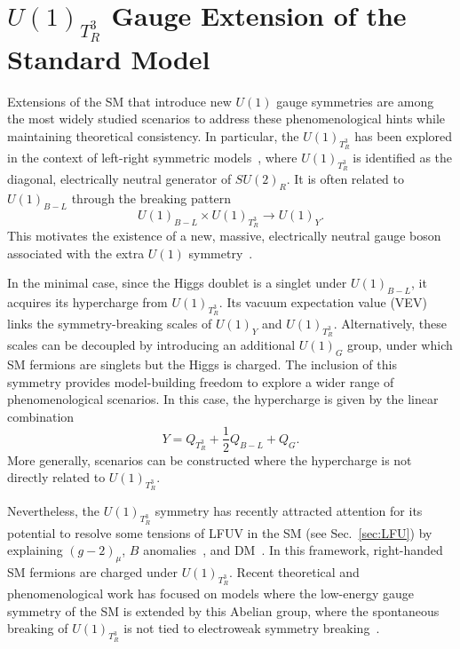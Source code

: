 \chapter{$U(1)_{T^3_R}$ Gauge Extension of the Standard Model}\label{ch:U1T3R}

Extensions of the SM that introduce new $U(1)$ gauge symmetries are among the most widely studied scenarios to address these phenomenological hints while maintaining theoretical consistency. In particular, the $U(1)_{T^3_R}$ has been explored in the context of left-right symmetric models~\parencite{Assad:2017iib, MohapatraPati1975, SenjanovicMohapatra1975}, where $U(1)_{T^3_R}$ is identified as the diagonal, electrically neutral generator of $SU(2)_R$. It is often related to $U(1)_{B-L}$ through the breaking pattern
\[
U(1)_{B-L} \times U(1)_{T^3_R} \rightarrow U(1)_Y.
\]
This motivates the existence of a new, massive, electrically neutral gauge boson associated with the extra $U(1)$ symmetry~\parencite{DiLuzio2018, Baker2019, Michaels:2020fzj, Dev:2021otb}. 

In the minimal case, since the Higgs doublet is a singlet under $U(1)_{B-L}$, it acquires its hypercharge from $U(1)_{T^3_R}$. Its vacuum expectation value (VEV) links the symmetry-breaking scales of $U(1)_Y$ and $U(1)_{T^3_R}$. Alternatively, these scales can be decoupled by introducing an additional $U(1)_G$ group, under which SM fermions are singlets but the Higgs is charged. The inclusion of this symmetry provides model-building freedom to explore a wider range of phenomenological scenarios. In this case, the hypercharge is given by the linear combination
\begin{equation}
Y=Q_{T^3_R}+\frac{1}{2}Q_{B-L} + Q_G.
\end{equation}
More generally, scenarios can be constructed where the hypercharge is not directly related to $U(1)_{T^3_R}$.

Nevertheless, the $U(1)_{T^3_R}$ symmetry has recently attracted attention for its potential to resolve some tensions of LFUV in the SM (see Sec.~\ref{sec:LFU}) by explaining $(g-2)_\mu$, $B$ anomalies~\parencite{Dutta2022}, and DM~\cite{Dutta2019, Dutta2020b, Dutta:2022qvn}. In this framework, right-handed SM fermions are charged under $U(1)_{T^3_R}$. Recent theoretical and phenomenological work has focused on models where the low-energy gauge symmetry of the SM is extended by this Abelian group, where the spontaneous breaking of $U(1)_{T^3_R}$ is not tied to electroweak symmetry breaking~\parencite{Dutta2019, Dutta2020, Dutta2020b, Dutta2022, Dutta:2022qvn, PhysRevD.107.095019, Dutta2023}.

